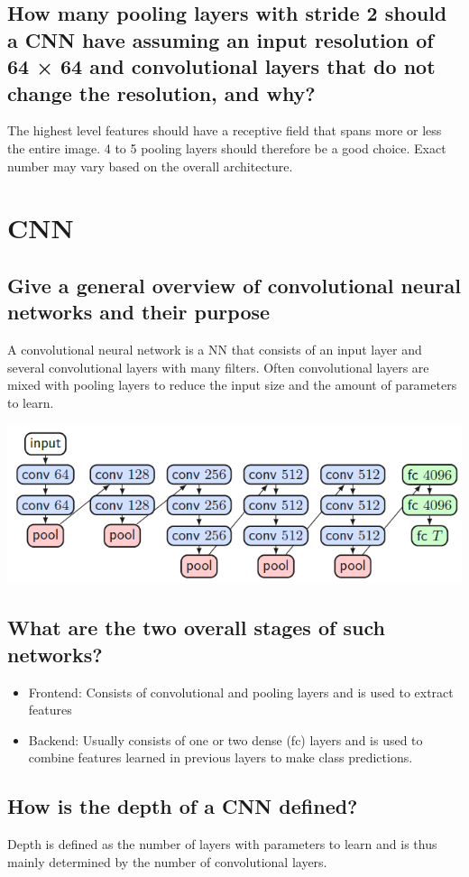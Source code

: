 \subsection{How many pooling layers with stride 2 should a CNN have assuming an input resolution of 64 × 64 and convolutional layers that do not change the resolution, and why?}
The highest level features should have a receptive field that spans more or less the entire image. 4 to 5 pooling layers should therefore be a good choice. Exact number may vary based on the overall architecture.
%
\section{CNN}
\subsection{Give a general overview of convolutional neural networks and their purpose}
A convolutional neural network is a NN that consists of an input layer and several convolutional layers with many filters. Often convolutional layers are mixed with pooling layers to reduce the input size and the amount of parameters to learn. 

\includegraphics[width=\textwidth]{./img/cnn.png}
\subsection{What are the two overall stages of such networks?}
\begin{itemize}
\item Frontend: Consists of convolutional and pooling layers and is used to extract features
\item Backend: Usually consists of one or two dense (fc) layers and is used to combine features learned in previous layers to make class predictions. 
\end{itemize}
\subsection{How is the depth of a CNN defined?}
Depth is defined as the number of layers with parameters to learn and is thus mainly determined by the number of convolutional layers.
